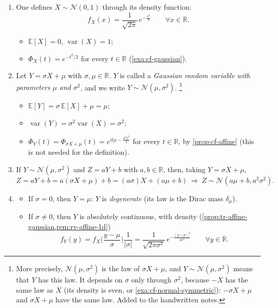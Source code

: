 \begin{enumerate}[label=\protect\textcircled{\scriptsize\arabic*},leftmargin=2.2em]
  \item One defines $X\sim\mathcal N(0,1)$ through its density function:
    \[
      f_X(x)=\frac1{\sqrt{2\pi}}\,e^{-\frac{x^2}2}\qquad\forall x\in\mathbb R .
    \]
    \begin{itemize}
      \item $\mathbb E[X]=0$, $\operatorname{var}(X)=1$;
      \item $\Phi_X(t)=e^{-t^2/2}$ for every $t\in\mathbb R$ (\cref{exa:cf-gaussian}).
    \end{itemize}
  \item Let $Y=\sigma X+\mu$ with $\sigma,\mu\in\mathbb R$. $Y$ is called a \emph{Gaussian random
    variable with parameters $\mu$ and $\sigma^2$}, and we write $Y\sim\mathcal N(\mu,\sigma^2)$.%
    \footnote{More precisely, $\mathcal N(\mu,\sigma^2)$ is the law of $\sigma X+\mu$, and
    $Y\sim\mathcal N(\mu,\sigma^2)$ means that $Y$ has this law. It depends on $\sigma$ only through
    $\sigma^2$, because $-X$ has the same law as $X$ (its density is even, or
    \cref{exa:cf-normal-symmetric}): $-\sigma X+\mu$ and $\sigma X+\mu$ have the same law. Added to
    the handwritten notes.}
    \begin{itemize}
      \item $\mathbb E[Y]=\sigma\,\mathbb E[X]+\mu=\mu$;
      \item $\operatorname{var}(Y)=\sigma^2\operatorname{var}(X)=\sigma^2$;
      \item $\Phi_Y(t)=\Phi_{\sigma X+\mu}(t)=e^{it\mu-\frac{\sigma^2t^2}2}$ for every
        $t\in\mathbb R$, by \cref{prop:cf-affine} (this is not needed for the definition).
    \end{itemize}
  \item If $Y\sim\mathcal N(\mu,\sigma^2)$ and $Z=aY+b$ with $a,b\in\mathbb R$, then, taking
    $Y=\sigma X+\mu$,
    \[
      Z=aY+b=a(\sigma X+\mu)+b=(a\sigma)X+(a\mu+b)\ \Longrightarrow\ Z\sim\mathcal N(a\mu+b,a^2\sigma^2).
    \]
  \item \begin{itemize}
      \item If $\sigma=0$, then $Y=\mu$: $Y$ is \emph{degenerate} (its law is the Dirac mass
        $\delta_\mu$).
      \item If $\sigma\ne0$, then $Y$ is absolutely continuous, with density
        (\cref{prop:tr-affine-gaussian,rem:rv-affine-1d})
        \begin{equation}\label{eq:gv-density-1d}
          f_Y(y)=f_X\Big(\frac{y-\mu}\sigma\Big)\frac1{|\sigma|}
          =\frac1{\sqrt{2\pi\sigma^2}}\,e^{-\frac{(y-\mu)^2}{2\sigma^2}}\qquad\forall y\in\mathbb R .
        \end{equation}
    \end{itemize}
\end{enumerate}

